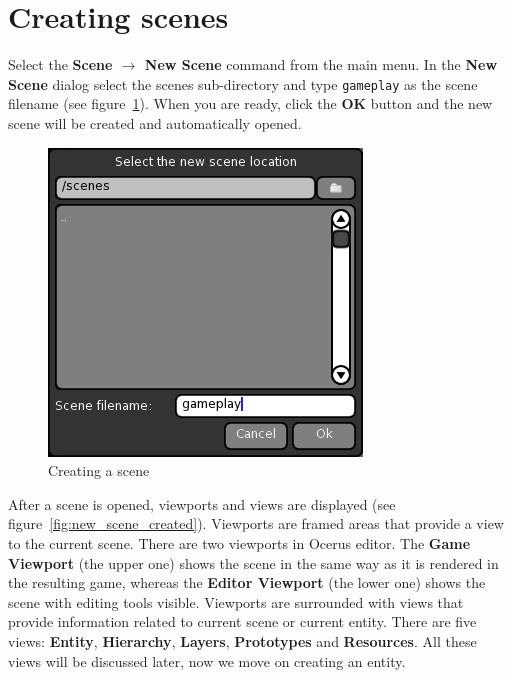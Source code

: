 \documentclass[a4paper,12pt]{article}
\begin{document}
\section{Creating scenes}
Select the \textbf{Scene $\to$ New Scene} command from the main menu. In the \textbf{New Scene} dialog select the scenes sub-directory and type \texttt{gameplay} as the scene filename (see figure~\ref{fig:new_scene}). When you are ready, click the \textbf{OK} button and the new scene will be created and automatically opened.

\begin{figure}[ht]
 \begin{center}
  \includegraphics[scale=0.65]{NewScene}
 \end{center}
 \caption{Creating a scene}
 \label{fig:new_scene}
\end{figure}


After a scene is opened, viewports and views are displayed (see figure~\ref{fig:new_scene_created}). Viewports are framed areas that provide a view to the current scene. There are two viewports in Ocerus editor. The \textbf{Game Viewport} (the upper one) shows the scene in the same way as it is rendered in the resulting game, whereas the \textbf{Editor Viewport} (the lower one) shows the scene with editing tools visible. Viewports are surrounded with views that provide information related to current scene or current entity. There are five views: \textbf{Entity}, \textbf{Hierarchy}, 
\textbf{Layers}, \textbf{Prototypes} and \textbf{Resources}. All these views will be discussed later, now we move on creating an entity.
\end{document}

